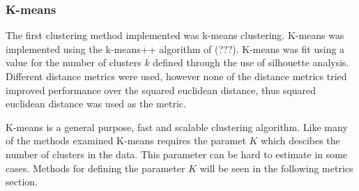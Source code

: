\documentclass[a4paper,11pt]{article}
\begin{document}
\subsubsection{K-means}

The first clustering method implemented was k-means clustering. K-means was implemented using the k-means++ algorithm of (???). K-means was fit using a value for the number of clusters $k$ defined through the use of silhouette analysis. Different distance metrics were used, however none of the distance metrics tried improved performance over the squared euclidean distance, thus squared euclidean distance was used as the metric.

K-means is a general purpose, fast and scalable clustering algorithm. Like many of the methods examined K-means requires the paramet $K$ which descibes the number of clusters in the data. This parameter can be hard to estimate in some cases. Methods for defining the parameter $K$ will be seen in the following metrics section.
\end{document}

